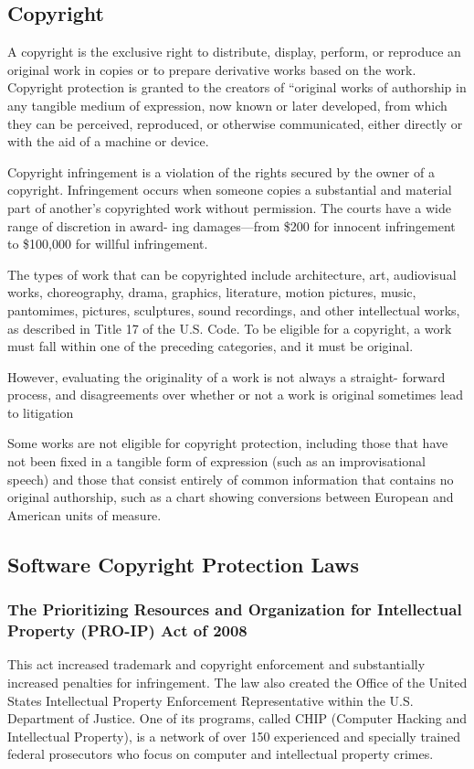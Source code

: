 \documentclass[11pt]{article}
\begin{document}
\subsection{Copyright}
\label{sec:org53ccbe5}
A copyright is the exclusive right to distribute, display, perform, or reproduce an
original work in copies or to prepare derivative works based on the work. Copyright
protection is granted to the creators of “original works of authorship in any tangible
medium of expression, now known or later developed, from which they can be perceived,
reproduced, or otherwise communicated, either directly or with the aid of a machine or
device.

Copyright infringement is a violation of the rights secured by the owner of a copyright.
Infringement occurs when someone copies a substantial and material part of another’s
copyrighted work without permission. The courts have a wide range of discretion in award-
ing damages—from \$200 for innocent infringement to \$100,000 for willful infringement.


The types of work that can be copyrighted include architecture, art, audiovisual works,
choreography, drama, graphics, literature, motion pictures, music, pantomimes, pictures,
sculptures, sound recordings, and other intellectual works, as described in Title 17 of the
U.S. Code. To be eligible for a copyright, a work must fall within one of the preceding
categories, and it must be original.

However, evaluating the originality of a work is not always a straight-
forward process, and disagreements over whether or not a work is original sometimes lead
to litigation

Some works are not eligible for copyright protection, including those that have not
been fixed in a tangible form of expression (such as an improvisational speech) and those
that consist entirely of common information that contains no original authorship, such as
a chart showing conversions between European and American units of measure.
\subsection{Software Copyright Protection Laws}
\label{sec:orgae778ee}
\subsubsection{The Prioritizing Resources and Organization for Intellectual Property (PRO-IP) Act of 2008}
\label{sec:orga7e1a4b}
This act increased trademark and copyright enforcement and substantially increased penalties for infringement. The law also created the Office of the United States Intellectual Property Enforcement Representative within the U.S. Department of Justice. One of its programs, called CHIP (Computer Hacking and Intellectual Property), is a network of over 150 experienced and specially trained federal prosecutors who focus on computer and intellectual property crimes.
\end{document}
